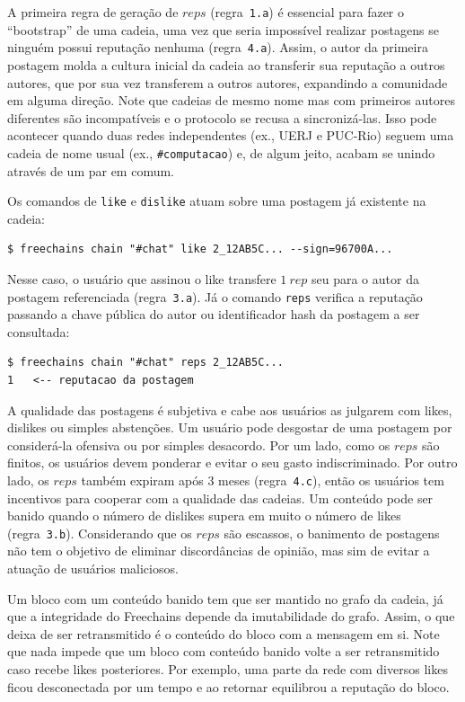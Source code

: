 \documentclass[12pt]{article}
\newcommand{\FC} {Freechains\xspace}
\begin{document}
A primeira regra de geração de $reps$ (regra~\texttt{1.a}) é essencial para
fazer o ``bootstrap'' de uma cadeia, uma vez que seria impossível realizar
postagens se ninguém possui reputação nenhuma (regra~\texttt{4.a}).
Assim, o autor da primeira postagem molda a cultura inicial da cadeia ao
transferir sua reputação a outros autores, que por sua vez transferem a outros
autores, expandindo a comunidade em alguma direção.
%
Note que cadeias de mesmo nome mas com primeiros autores diferentes são
incompatíveis e o protocolo se recusa a sincronizá-las.
Isso pode acontecer quando duas redes independentes (ex., UERJ e PUC-Rio)
seguem uma cadeia de nome usual (ex., \texttt{\#computacao}) e, de algum jeito,
acabam se unindo através de um par em comum.

Os comandos de \texttt{like} e \texttt{dislike} atuam sobre uma postagem já
existente na cadeia:

{\footnotesize
\begin{verbatim}
$ freechains chain "#chat" like 2_12AB5C... --sign=96700A...
\end{verbatim}
}

Nesse caso, o usuário que assinou o like transfere $1~rep$ seu para o autor da
postagem referenciada (regra~\texttt{3.a}).
%
Já o comando \texttt{reps} verifica a reputação passando a chave pública do
autor ou identificador hash da postagem a ser consultada:

{\footnotesize
\begin{verbatim}
$ freechains chain "#chat" reps 2_12AB5C...
1   <-- reputacao da postagem
\end{verbatim}
}

A qualidade das postagens é subjetiva e cabe aos usuários as julgarem com
likes, dislikes ou simples abstenções.
Um usuário pode desgostar de uma postagem por considerá-la ofensiva ou por
simples desacordo.
Por um lado, como os $reps$ são finitos, os usuários devem ponderar e evitar o
seu gasto indiscriminado.
Por outro lado, os $reps$ também expiram após 3 meses (regra~\texttt{4.c}),
então os usuários tem incentivos para cooperar com a qualidade das cadeias.
Um conteúdo pode ser banido quando o número de dislikes supera em muito o
número de likes (regra~\texttt{3.b}).
Considerando que os $reps$ são escassos, o banimento de postagens não tem o
objetivo de eliminar discordâncias de opinião, mas sim de evitar a atuação de
usuários maliciosos.

Um bloco com um conteúdo banido tem que ser mantido no grafo da cadeia, já que
a integridade do \FC depende da imutabilidade do grafo.
Assim, o que deixa de ser retransmitido é o conteúdo do bloco com a mensagem em
si.
Note que nada impede que um bloco com conteúdo banido volte a ser retransmitido
caso recebe likes posteriores.
Por exemplo, uma parte da rede com diversos likes ficou desconectada por um
tempo e ao retornar equilibrou a reputação do bloco.
\end{document}
